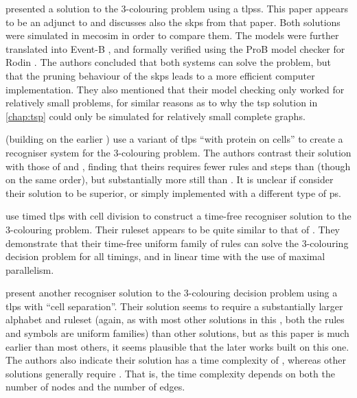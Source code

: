 
\citeauthor{Turcanu2012} \cite{Turcanu2012} presented a solution to the 3-colouring problem using a \glspl{tlps}. This paper appears to be an adjunct to \cite{Gheorghe2013} and discusses also the \gls{skps} from that paper.  Both solutions were simulated in \gls{mecosim} in order to compare them.  The models were further translated into Event-B \cite{Abrial2010}, and formally verified using the ProB model checker \cite{Leuschel2008} for Rodin \cite{Abrial2010a}.  The authors concluded that both systems can solve the problem, but that the pruning behaviour of the \gls{skps} leads to a more efficient computer implementation.  They also mentioned that their model checking only worked for relatively small problems, for similar reasons as to why the \gls{tsp} solution in \cref{chap:tsp} could only be simulated for relatively small complete graphs.


\citeauthor{Christinal2018} \cite{Christinal2018} (building on the earlier \cite{Mathu2015}) use a variant of \gls{tlps} \enquote{with protein on cells} to create a recogniser system for the 3-colouring problem.  The authors contrast their solution with those of \cite{Diaz-Pernil2008} and \cite{Gheorghe2013}, finding that theirs requires fewer rules and steps than \cite{Diaz-Pernil2008} (though on the same order), but substantially more still than \cite{Gheorghe2013}.  It is unclear if \citeauthor{Christinal2018} consider their solution to be superior, or simply implemented with a different type of \gls{ps}.


\citeauthor{Niu2016} \cite{Niu2016} use timed \gls{tlps} with cell division to construct a time-free recogniser solution to the 3-colouring problem. Their \gls{ruleset} appears to be quite similar to that of \cite{Turcanu2012}.  They demonstrate that their time-free uniform family of rules can solve the 3-colouring decision problem for all timings, and in linear time with the use of maximal parallelism.


\citeauthor{Wang2009} \cite{Wang2009} present another recogniser solution to the 3-colouring decision problem using a \gls{tlps} with \enquote{cell separation}.  Their solution seems to require a substantially larger alphabet and \gls{ruleset} (again, as with most other solutions in this , both the rules and symbols are uniform families) than other solutions, but as this paper is much earlier than most others, it seems plausible that the later works built on this one.  The authors also indicate their solution has a time complexity of , whereas other solutions generally require .  That is, the time complexity depends on both the number of nodes and the number of edges.



